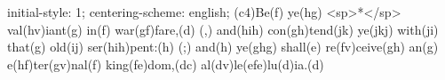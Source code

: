 initial-style: 1;
centering-scheme: english;
(c4)Be(f) ye(hg) <sp>*</sp> val(hv)iant(g) in(f) war(gf)fare,(d) (,) and(hih) con(gh)tend(jk) ye(jkj) with(ji) that(g) old(ij) ser(hih)pent:(h) (;) and(h) ye(ghg) shall(e) re(fv)ceive(gh) an(g) e(hf)ter(gv)nal(f) king(fe)dom,(dc) al(dv)le(efe)lu(d)ia.(d)
